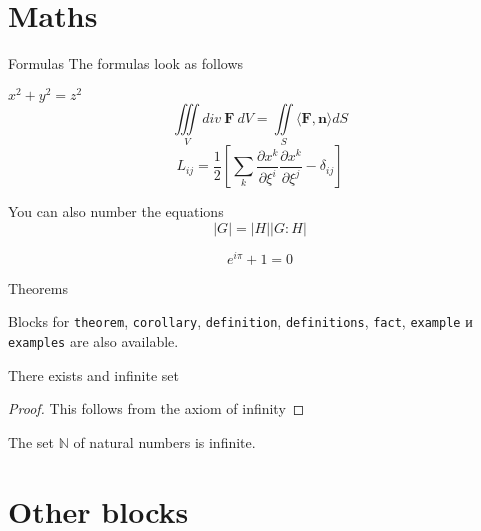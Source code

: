 \documentclass[usenames,dvipsnames,]{beamer}
\begin{document}
\section{Maths}

\begin{frame}{Formulas}
The formulas look as follows
\begin{center}
 $x^2 + y^2 = z^2$
 $$\iiint\limits_V div\  \mathbf{F}\  dV=\iint\limits_S \langle\mathbf{F},\mathbf{n}\rangle dS$$
 $$L_{ij}=\frac{1}{2}\left[ \sum_k \frac{\partial x^k}{\partial \xi^i}\frac{\partial x^k}{\partial \xi^j}- \delta_{ij} \right]$$
\end{center}

You can also number the equations
\begin{equation}
|G|=|H||G:H|
\end{equation}

\begin{equation}
e^{i\pi}+1=0 \tag{a custom tag}
\end{equation}

\vskip 0.5cm


\end{frame}

\begin{frame}{Theorems}

Blocks for \texttt{theorem}, \texttt{corollary}, \texttt{definition}, \texttt{definitions}, \texttt{fact}, \texttt{example} и \texttt{examples} are also available.

\begin{theorem}
There exists and infinite set
\end{theorem}
\begin{proof}[Proof]
This follows from the axiom of infinity
\end{proof}
\begin{example}[Natural]
The set $\mathbb{N}$ of natural numbers is infinite.
\end{example}

\end{frame}

\section{Other blocks}
\end{document}
